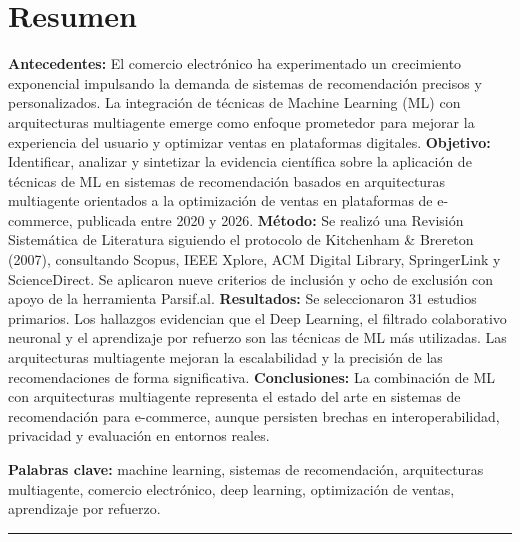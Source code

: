 \documentclass[12pt, a4paper]{article}
\newcommand{\RSL}{Revisi\'on Sistem\'atica de Literatura}
\begin{document}
\section*{Resumen}
\noindent
\textbf{Antecedentes:} El comercio electr\'onico ha experimentado un
crecimiento exponencial impulsando la demanda de sistemas de recomendaci\'on
precisos y personalizados. La integraci\'on de t\'ecnicas de Machine Learning
(ML) con arquitecturas multiagente emerge como enfoque prometedor para
mejorar la experiencia del usuario y optimizar ventas en plataformas digitales.
\textbf{Objetivo:} Identificar, analizar y sintetizar la evidencia cient\'ifica
sobre la aplicaci\'on de t\'ecnicas de ML en sistemas de recomendaci\'on basados
en arquitecturas multiagente orientados a la optimizaci\'on de ventas en
plataformas de e-commerce, publicada entre 2020 y 2026.
\textbf{M\'etodo:} Se realiz\'o una \RSL{} siguiendo el protocolo de
Kitchenham \& Brereton (2007), consultando Scopus, IEEE Xplore, ACM Digital
Library, SpringerLink y ScienceDirect. Se aplicaron nueve criterios de
inclusi\'on y ocho de exclusi\'on con apoyo de la herramienta Parsif.al.
\textbf{Resultados:} Se seleccionaron 31 estudios primarios. Los hallazgos
evidencian que el Deep Learning, el filtrado colaborativo neuronal y el
aprendizaje por refuerzo son las t\'ecnicas de ML m\'as utilizadas. Las
arquitecturas multiagente mejoran la escalabilidad y la precisi\'on de las
recomendaciones de forma significativa.
\textbf{Conclusiones:} La combinaci\'on de ML con arquitecturas multiagente
representa el estado del arte en sistemas de recomendaci\'on para e-commerce,
aunque persisten brechas en interoperabilidad, privacidad y evaluaci\'on en
entornos reales.

\vspace{0.4em}
\noindent\textbf{Palabras clave:} machine learning, sistemas de recomendaci\'on,
arquitecturas multiagente, comercio electr\'onico, deep learning, optimizaci\'on
de ventas, aprendizaje por refuerzo.

\vspace{0.5em}\noindent\rule{\linewidth}{0.4pt}

\end{document}
